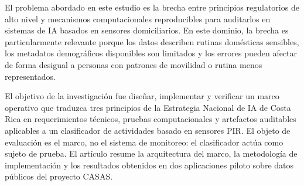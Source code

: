 El problema abordado en este estudio es la brecha entre principios regulatorios
de alto nivel y mecanismos computacionales reproducibles para auditarlos en
sistemas de IA basados en sensores domiciliarios. En este dominio, la brecha es
particularmente relevante porque los datos describen rutinas domésticas
sensibles, los metadatos demográficos disponibles son limitados y los errores
pueden afectar de forma desigual a personas con patrones de movilidad o rutina
menos representados.

El objetivo de la investigación fue diseñar, implementar y verificar un marco
operativo que traduzca tres principios de la Estrategia Nacional de IA de Costa
Rica en requerimientos técnicos, pruebas computacionales y artefactos auditables
aplicables a un clasificador de actividades basado en sensores PIR. El objeto
de evaluación es el marco, no el sistema de monitoreo: el clasificador actúa
como sujeto de prueba. El artículo resume la arquitectura del marco, la
metodología de implementación y los resultados obtenidos en dos aplicaciones
piloto sobre datos públicos del proyecto CASAS.
